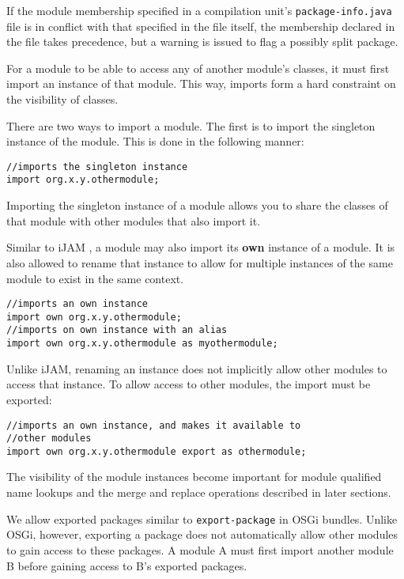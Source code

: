 If the module membership specified in a compilation unit's {\tt package-info.java}
file is in conflict with that specified in the file itself, the membership
declared in the file takes precedence, but a warning is issued to flag a possibly
split package.


For a module to be able to access any of another module's classes,
it must first import an instance of that module. This way, imports form
a hard constraint on the visibility of classes.

There are two ways to import a module. The first is to import the singleton
instance of the module. This is done in the following manner:

\begin{lstlisting}
//imports the singleton instance
import org.x.y.othermodule;
\end{lstlisting}

Importing the singleton instance of a module allows you to share the classes
of that module with other modules that also import it.

Similar to iJAM \cite{iJAM}, a module may also import its \textbf{own} instance of
a module. It is also allowed to rename that instance to allow for multiple
instances of the same module to exist in the same context.

\begin{lstlisting}
//imports an own instance
import own org.x.y.othermodule;
//imports on own instance with an alias
import own org.x.y.othermodule as myothermodule;
\end{lstlisting}

Unlike iJAM, renaming an instance does not implicitly allow other
modules to access that instance. To allow access to other modules, the import
must be exported:

\begin{lstlisting}
//imports an own instance, and makes it available to
//other modules
import own org.x.y.othermodule export as othermodule;
\end{lstlisting}

The visibility of the module instances become important for module
qualified name lookups and the merge and replace operations described in later
sections.


We allow exported packages similar to {\tt export-package} in OSGi bundles. Unlike OSGi, however,
exporting a package does not automatically allow other modules to gain
access to these packages. A module A must first import another module B
before gaining access to B's exported packages.

